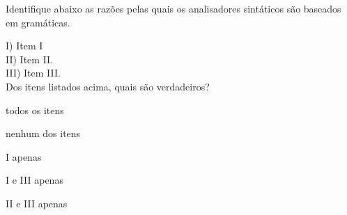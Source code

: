 \question[10]

Identifique abaixo as razões pelas quais os analisadores sintáticos são
baseados em gramáticas.

I) Item I\\
II) Item II.\\
III) Item III.\\

Dos itens listados acima, quais são verdadeiros?\\

\begin{choices}
\item todos os itens %
\item nenhum dos itens
\item I apenas
\item I e III apenas
\item II e III apenas
\end{choices}
\answerline


